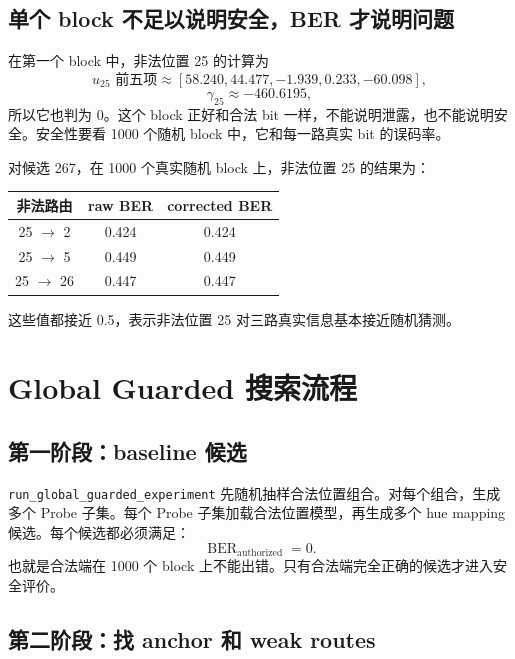 \documentclass[UTF8,a4paper,11pt]{ctexart}
\newcommand{\BER}{\operatorname{BER}}
\begin{document}
\subsection{单个 block 不足以说明安全，BER 才说明问题}

在第一个 block 中，非法位置 25 的计算为
\[
u_{25}\text{ 前五项}\approx[58.240,44.477,-1.939,0.233,-60.098],
\]
\[
\gamma_{25}\approx -460.6195,
\]
所以它也判为 0。这个 block 正好和合法 bit 一样，不能说明泄露，也不能说明安全。安全性要看 1000 个随机 block 中，它和每一路真实 bit 的误码率。

对候选 267，在 1000 个真实随机 block 上，非法位置 25 的结果为：
\begin{center}
\begin{tabular}{ccc}
\toprule
非法路由 & raw BER & corrected BER\\
\midrule
25 $\rightarrow$ 2 & 0.424 & 0.424\\
25 $\rightarrow$ 5 & 0.449 & 0.449\\
25 $\rightarrow$ 26 & 0.447 & 0.447\\
\bottomrule
\end{tabular}
\end{center}

这些值都接近 0.5，表示非法位置 25 对三路真实信息基本接近随机猜测。

\section{Global Guarded 搜索流程}

\subsection{第一阶段：baseline 候选}

\texttt{run\_global\_guarded\_experiment} 先随机抽样合法位置组合。对每个组合，生成多个 Probe 子集。每个 Probe 子集加载合法位置模型，再生成多个 hue mapping 候选。每个候选都必须满足：
\[
\BER_{\mathrm{authorized}}=0.
\]
也就是合法端在 1000 个 block 上不能出错。只有合法端完全正确的候选才进入安全评价。

\subsection{第二阶段：找 anchor 和 weak routes}
\end{document}

